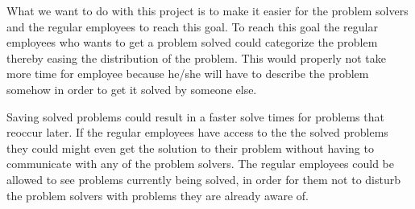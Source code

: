 What we want to do with this project is to make it easier for the problem solvers and the regular employees to reach this goal.
To reach this goal the regular employees who wants to get a problem solved could categorize the problem thereby easing the distribution of the problem.
This would properly not take more time for employee because he/she will have to describe the problem somehow in order to get it solved by someone else.

Saving solved problems could result in a faster solve times for problems that reoccur later.
If the regular employees have access to the the solved problems they could might even get the solution to their problem without having to communicate with any of the problem solvers.
The regular employees could be allowed to see problems currently being solved, in order for them not to disturb the problem solvers with problems they are already aware of.







